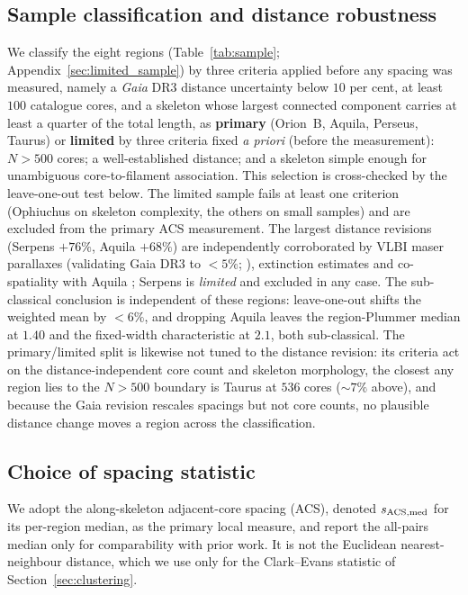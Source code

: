\documentclass[usenatbib,twoside,twocolumn]{mnras}
\begin{document}
\subsection{Sample classification and distance robustness}
\label{sec:distance_uncertainties}

We classify the eight regions (Table~\ref{tab:sample}; Appendix~\ref{sec:limited_sample}) by three criteria applied before any spacing was measured, namely a \textit{Gaia} DR3 distance uncertainty below $10$ per cent, at least $100$ catalogue cores, and a skeleton whose largest connected component carries at least a quarter of the total length, as \textbf{primary} (Orion~B, Aquila, Perseus, Taurus) or \textbf{limited} by three criteria fixed \emph{a priori} (before the measurement): $N>500$ cores; a well-established distance; and a skeleton simple enough for unambiguous core-to-filament association. This selection is cross-checked by the leave-one-out test below. The limited sample fails at least one criterion (Ophiuchus on skeleton complexity, the others on small samples) and are excluded from the primary ACS measurement. The largest distance revisions (Serpens $+76\%$, Aquila $+68\%$) are independently corroborated by VLBI maser parallaxes (validating Gaia DR3 to $<5\%$; \citealt{Kounkel2018,Xu2021,OrtizLeon2018,OrtizLeon2017}), extinction estimates \citep{Yan2022,Green2024} and co-spatiality with Aquila \citep{Zucker2020}; Serpens is \emph{limited} and excluded in any case. The sub-classical conclusion is independent of these regions: leave-one-out shifts the weighted mean by $<6\%$, and dropping Aquila leaves the region-Plummer median at $1.40$ and the fixed-width characteristic at $2.1$, both sub-classical. The primary/limited split is likewise not tuned to the distance revision: its criteria act on the distance-independent core count and skeleton morphology, the closest any region lies to the $N>500$ boundary is Taurus at $536$ cores ($\sim7\%$ above), and because the Gaia revision rescales spacings but not core counts, no plausible distance change moves a region across the classification.

\subsection{Choice of spacing statistic}
\label{sec:statistics}

We adopt the along-skeleton adjacent-core spacing (ACS), denoted $s_{\rm ACS,med}$ for its per-region median, as the primary local measure, and report the all-pairs median only for comparability with prior work. It is not the Euclidean nearest-neighbour distance, which we use only for the Clark--Evans statistic of Section~\ref{sec:clustering}.
\end{document}

